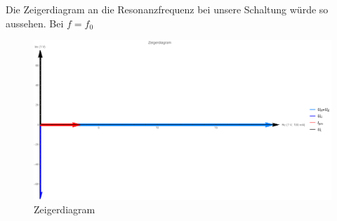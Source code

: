 Die Zeigerdiagram an die Resonanzfrequenz bei unsere Schaltung würde so aussehen. Bei $f=f_0$
\begin{figure}[H]
  \centering
  \includegraphics[width=0.9\linewidth]{src/elnw3.pdf}
  \caption{Zeigerdiagram}
  \label{fig:3_Sim_Spannungsquelle}
\end{figure}
%
%
%
%
%
%
%
%
%
%
%
%
%
%
%
%
